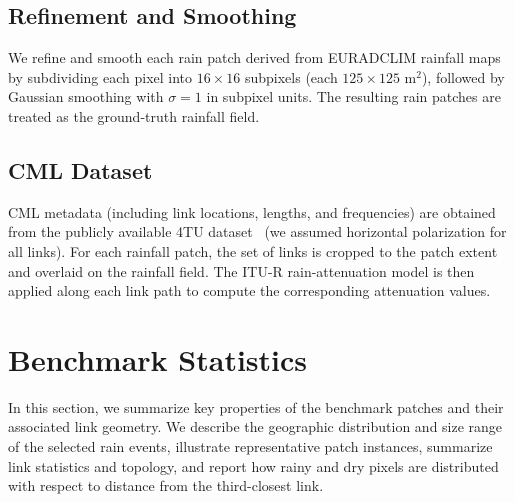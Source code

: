 \documentclass[a4paper,fleqn]{cas-sc}
\begin{document}
\subsection{Refinement and Smoothing}
We refine and smooth each rain patch derived from EURADCLIM rainfall maps by subdividing each pixel into $16 \times 16$ subpixels (each $125 \times 125$ m$^2$), followed by Gaussian smoothing with $\sigma = 1$ in subpixel units.
The resulting rain patches are treated as the ground-truth rainfall field.

\subsection{CML Dataset}
CML metadata (including link locations, lengths, and frequencies) are obtained from the publicly available 4TU dataset~\citep{overeem2016cml} (we assumed horizontal polarization for all links). For each rainfall patch, the set of links is cropped to the patch extent and overlaid on the rainfall field. The ITU-R rain-attenuation model is then applied along each link path to compute the corresponding attenuation values.



\section{Benchmark Statistics}
In this section, we summarize key properties of the benchmark patches and their associated link geometry. We describe the geographic distribution and size range of the selected rain events, illustrate representative patch instances, summarize link statistics and topology, and report how rainy and dry pixels are distributed with respect to distance from the third-closest link.
\end{document}

